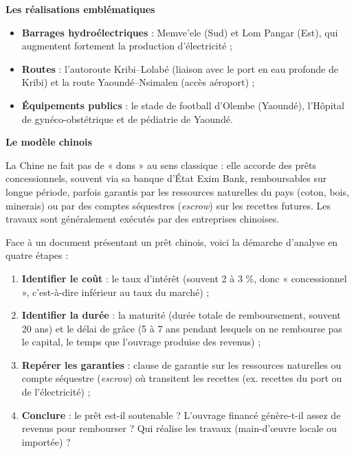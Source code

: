 \documentclass[11pt]{article}
\newcommand{\cle}[1]{{\popxbold\color{popdark}#1}}
\begin{document}
\textbf{Les réalisations emblématiques}\par
\begin{itemize}
\item \textbf{Barrages hydroélectriques} : Memve'ele (Sud) et Lom Pangar (Est), qui augmentent fortement la production d'électricité ;
\item \textbf{Routes} : l'autoroute Kribi--Lolabé (liaison avec le port en eau profonde de Kribi) et la route Yaoundé--Nsimalen (accès aéroport) ;
\item \textbf{Équipements publics} : le stade de football d'Olembe (Yaoundé), l'Hôpital de gynéco-obstétrique et de pédiatrie de Yaoundé.
\end{itemize}

\textbf{Le modèle chinois}\par
La Chine ne fait pas de « dons » au sens classique : elle accorde des \cle{prêts concessionnels}, souvent via sa banque d'État \cle{Exim Bank}, remboursables sur longue période, parfois garantis par les ressources naturelles du pays (coton, bois, minerais) ou par des comptes séquestres (\emph{escrow}) sur les recettes futures. Les travaux sont généralement exécutés par des entreprises chinoises.

\begin{methode}
Face à un document présentant un prêt chinois, voici la démarche d'analyse en quatre étapes :
\begin{enumerate}
\item \textbf{Identifier le coût} : le taux d'intérêt (souvent 2 à 3 \%, donc « concessionnel », c'est-à-dire inférieur au taux du marché) ;
\item \textbf{Identifier la durée} : la maturité (durée totale de remboursement, souvent 20 ans) et le \cle{délai de grâce} (5 à 7 ans pendant lesquels on ne rembourse pas le capital, le temps que l'ouvrage produise des revenus) ;
\item \textbf{Repérer les garanties} : clause de garantie sur les ressources naturelles ou compte séquestre (\emph{escrow}) où transitent les recettes (ex. recettes du port ou de l'électricité) ;
\item \textbf{Conclure} : le prêt est-il soutenable ? L'ouvrage financé génère-t-il assez de revenus pour rembourser ? Qui réalise les travaux (main-d'œuvre locale ou importée) ?
\end{enumerate}
\end{methode}
\end{document}

